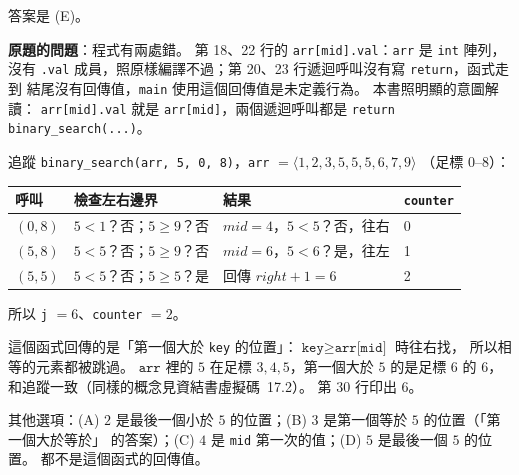 \begin{pastsoln}
答案是 (E)。

\textbf{原題的問題}：程式有兩處錯。 第 18、22 行的 \texttt{arr[mid].val}：\texttt{arr} 是 \texttt{int}
陣列，沒有 \texttt{.val} 成員，照原樣編譯不過；第 20、23 行遞迴呼叫沒有寫 \texttt{return}，函式走到
結尾沒有回傳值，\texttt{main} 使用這個回傳值是未定義行為。 本書照明顯的意圖解讀：
\texttt{arr[mid].val} 就是 \texttt{arr[mid]}，兩個遞迴呼叫都是 \texttt{return binary\_search(...)}。

追蹤 \texttt{binary\_search(arr, 5, 0, 8)}，\texttt{arr} $= \langle 1, 2, 3, 5, 5, 5, 6, 7, 9\rangle$
（足標 $0$--$8$）：
\begin{center}
\small
\begin{tabular}{llll}
\toprule
呼叫 & 檢查左右邊界 & 結果 & \texttt{counter} \\
\midrule
$(0, 8)$ & $5 < 1$？否；$5 \ge 9$？否 & $\mathit{mid} = 4$，$5 < 5$？否，往右 & 0 \\
$(5, 8)$ & $5 < 5$？否；$5 \ge 9$？否 & $\mathit{mid} = 6$，$5 < 6$？是，往左 & 1 \\
$(5, 5)$ & $5 < 5$？否；$5 \ge 5$？是 & 回傳 $\mathit{right} + 1 = 6$ & 2 \\
\bottomrule
\end{tabular}
\end{center}
所以 \texttt{j} $= 6$、\texttt{counter} $= 2$。

這個函式回傳的是「第一個大於 \texttt{key} 的位置」：$\texttt{key} \ge \texttt{arr[mid]}$ 時往右找，
所以相等的元素都被跳過。 $\texttt{arr}$ 裡的 $5$ 在足標 $3, 4, 5$，第一個大於 $5$ 的是足標 $6$ 的
$6$，和追蹤一致（同樣的概念見資結書虛擬碼~17.2）。 第 30 行印出 $6$。

其他選項：(A) $2$ 是最後一個小於 $5$ 的位置；(B) $3$ 是第一個等於 $5$ 的位置（「第一個大於等於」
的答案）；(C) $4$ 是 \texttt{mid} 第一次的值；(D) $5$ 是最後一個 $5$ 的位置。 都不是這個函式的回傳值。
\end{pastsoln}

